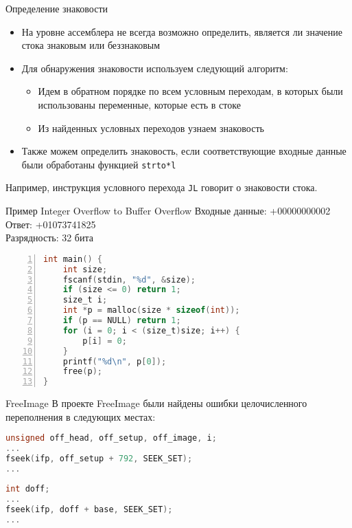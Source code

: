 \documentclass[10pt]{beamer}
\begin{document}
\begin{frame}{Определение знаковости}
\begin{itemize}
    \item На уровне ассемблера не всегда возможно определить, является ли
        значение стока знаковым или беззнаковым
    \item Для обнаружения знаковости используем следующий алгоритм:
    \begin{itemize}
        \item Идем в обратном порядке по всем условным переходам, в которых были использованы
            переменные, которые есть в стоке
        \item Из найденных условных переходов узнаем знаковость
    \end{itemize}
    \item Также можем определить знаковость, если соответствующие входные данные
        были обработаны функцией \texttt{strto*l}
\end{itemize}
Например, инструкция условного перехода \texttt{JL} говорит о знаковости
стока.
\end{frame}

\begin{frame}[fragile]{Пример Integer Overflow to Buffer Overflow}
    Входные данные: +00000000002\\
    Ответ: +01073741825 \\
    Разрядность: 32 бита
\begin{lstlisting}[language=C, basicstyle=\footnotesize, numbers=left,
                   xleftmargin=2em, numberstyle=\tiny\color{gray}]
int main() {
    int size;
    fscanf(stdin, "%d", &size);
    if (size <= 0) return 1;
    size_t i;
    int *p = malloc(size * sizeof(int));
    if (p == NULL) return 1;
    for (i = 0; i < (size_t)size; i++) {
        p[i] = 0;
    }
    printf("%d\n", p[0]);
    free(p);
}
\end{lstlisting}
\end{frame}

\begin{frame}[fragile]{FreeImage}
В проекте FreeImage были найдены ошибки целочисленного переполнения в следующих
местах:

\begin{lstlisting}[language=C, basicstyle=\small\ttfamily,
                   xleftmargin=1em,
                   captionpos=b,
                   label=lst:freeimage_bmp_overflow]
unsigned off_head, off_setup, off_image, i;
...
fseek(ifp, off_setup + 792, SEEK_SET);
...
\end{lstlisting}

\begin{lstlisting}[language=C, basicstyle=\small\ttfamily,
                   xleftmargin=1em,
                   captionpos=b,
                   label=lst:freeimage_tiff_overflow]
int doff;
...
fseek(ifp, doff + base, SEEK_SET);
...
\end{lstlisting}
\end{frame}
\end{document}
